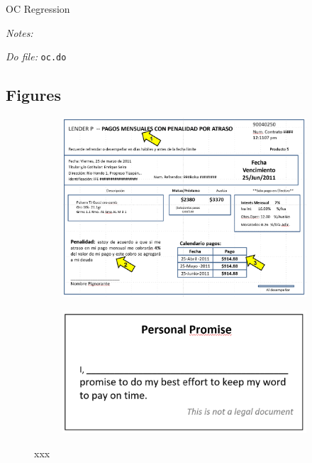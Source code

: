 \documentclass[11pt]{article}
\begin{document}
\begin{table}[H]
\caption{OC Regression}
\label{oc_reg}
\begin{center}
\scriptsize{}
\end{center}
 \footnotesize
\textit{Notes:} 

\textit{Do file: } \texttt{oc.do}
\end{table}


\pagebreak



\subsection{Figures}


\begin{figure}[H]
     \caption{Contract Terms Summary, and Promise Slip}
    \label{PaperSlip}
    \begin{center}
    \begin{subfigure}{0.75\textwidth}
        \centering
        \includegraphics[width=\textwidth]{Figuras/ContractDonde.png}
    \end{subfigure}
    \begin{subfigure}{0.4\textwidth}
        \centering
        \includegraphics[width=\textwidth]{Figuras/PersonalPromise.png}
    \end{subfigure}
    \end{center}
    \scriptsize
         xxx 
\end{figure}
\end{document}

